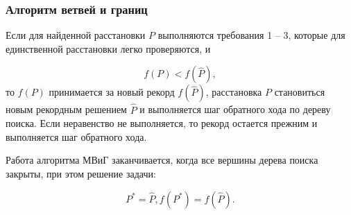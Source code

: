 \begin{frame}
    \fontsize{8pt}{7.2}\selectfont
    \frametitle{Алгоритм ветвей и границ}
    \justifying
    Если для найденной расстановки $P$ выполняются требования 1 – 3, которые для единственной расстановки легко проверяются, и

    \begin{displaymath}
        f(P) < f(\widehat{P}),
    \end{displaymath}
    то $f(P)$ принимается за новый рекорд $f(\widehat{P})$, расстановка $P$ становиться новым рекордным решением $\widehat{P}$ и выполняется шаг обратного хода по дереву поиска. Если неравенство не выполняется, то рекорд остается прежним и выполняется шаг обратного хода.

    \bigskip
    Работа алгоритма МВиГ заканчивается, когда все вершины дерева поиска закрыты, при этом решение задачи: 

    \begin{displaymath}
        P^{*} = \widehat{P},  f(P^*) = f(\widehat{P}).
    \end{displaymath}

    \bigskip
    \bigskip
\end{frame}

